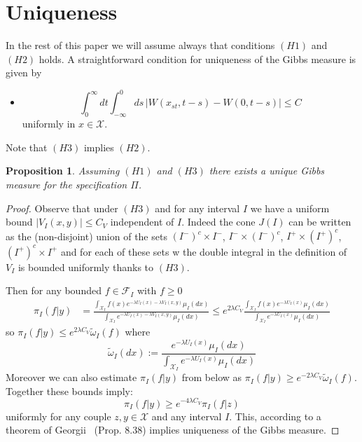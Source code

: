 \documentclass[a4paper,12pt,reqno]{amsart}
\newtheorem{proposition}[theorem]{Proposition}
\newcommand{\X}{\mathcal{X}}
\newcommand{\F}{\mathcal{F}}
\begin{document}
\section{Uniqueness}
\label{sec:uniqueness}
In the rest of this paper we will assume always that conditions $(H1)$ and $(H2)$ holds. 
 A straightforward condition for uniqueness of the Gibbs measure is given by
\begin{itemize}
\item[\textbf{(H3)}]
$$
\int_0^\infty dt \int^0_{-\infty} ds \,|W(x_{st},t-s)-W(0,t-s)| \le C
$$
uniformly in $x \in \X$.
\end{itemize}  
Note that $(H3)$ implies $(H2)$.
\begin{proposition}
\label{prop:unique1}
Assuming $(H1)$ and $(H3)$ there exists a unique Gibbs measure for the
specification $\Pi$.  
\end{proposition}
\begin{proof}
Observe that under $(H3)$ and for any interval $I$ we have a uniform bound $|V_I(x,y)| \le C_V$ independent of $I$. Indeed the cone $J(I)$ can be written as the (non-disjoint) union of the sets $(I^-)^c \times I^-$, $I^- \times (I^-)^c$, $I^+ \times (I^+)^c$, $(I^+)^c \times I^+$ and for each of these sets w the double integral in the definition of $V_I$ is bounded uniformly thanks to $(H3)$.

Then for any bounded $f \in \F_I$ with $f \ge 0$
\begin{equation}
  \begin{split}
\pi_I(f|y) & = \frac{\int_{\X_I} f(x ) e^{-\lambda U_I(x)
    -\lambda V_I(x,y)} \mu_I(dx)}{\int_{\X_I}  e^{-\lambda U_I(x)
    -\lambda V_I(x,y)} \mu_I(dx)}
 \le e^{2\lambda C_V} \frac{\int_{\X_I} f(x ) e^{-\lambda U_I(x)
    } \mu_I(dx)}{\int_{\X_I}  e^{-\lambda U_I(x)
  } \mu_I(dx)}
  \end{split}
\end{equation}
so $\pi_I(f|y) \le e^{2\lambda C_V} \widetilde\omega_I(f)$ where
$$
\widetilde\omega_I(dx) :=  \frac{   e^{-\lambda U_I(x)}  \mu_I(dx)}{ \int_{\X_I}  e^{-\lambda U_I(x) }\mu_I(dx)}
$$
Moreover we can also estimate $\pi_I(f|y)$ from below as $\pi_I(f|y) \ge e^{-2\lambda C_V} \widetilde\omega_I(f)$.
Together these bounds  imply:
\begin{equation}
  \pi_I(f|y)  \ge e^{-4 \lambda C_V}
\pi_I(f|z)
\end{equation}
uniformly for any couple $z,y \in \X$ and any interval $I$. This, according to a theorem of Georgii~\cite{Georgii}
(Prop. 8.38) implies uniqueness of the Gibbs measure.
\end{proof}
\end{document}
